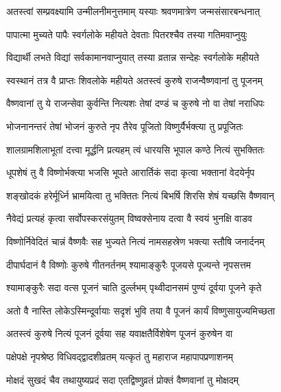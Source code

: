 \label{sec:padma-unmilani}



\twolineshloka
{अतस्त्वां सम्प्रवक्ष्यामि उन्मीलनीमनुत्तमाम्}
{यस्याः श्रवणमात्रेण जन्मसंसारबन्धनात्}%

\twolineshloka
{पापात्मा मुच्यते पापैः स्वर्गलोके महीयते}
{देवताः पितरश्चैव तस्या गतिमवाप्नुयुः}%

\twolineshloka
{विद्यार्थी लभते विद्यां सर्वकामानवाप्नुयात्}
{तस्या व्रतान्न सन्देहः स्वर्गलोके महीयते}%

\twolineshloka
{स्वस्थानं तत्र वै प्राप्तः शिवलोके महीयते}
{अतस्त्वं कुरुषे राजन्वैष्णवानां तु पूजनम्}%

\twolineshloka
{वैष्णवानां तु ये राजन्सेवा कुर्वन्ति नित्यशः}
{तेषां दण्डं च कुरुषे नो वा तेषां नराधिपः}%

\twolineshloka
{भोजनानन्तरं तेषां भोजनं कुरुते नृप}
{तैरेव पूजितो विष्णुर्यैर्भक्त्या तु प्रपूजितः}%

\twolineshloka
{शालग्रामशिलाभूतां दत्त्वा मूर्द्धनि प्रत्यहम्}
{त्वं धारयसि भूपाल कण्ठे नित्यं सुभक्तितः}%

\twolineshloka
{धूपशेषं तु वै विष्णोर्भक्त्या भजसि भूपते}
{आरार्तिकं सदा कृत्वा भक्तानां वेदयेर्नृप}%

\twolineshloka
{शङ्खोदकं हरेर्मूर्ध्नि भ्रामयित्वा तु भक्तितः}
{नित्यं बिभर्षि शिरसि शेषं यच्छसि वैष्णवान्}%

\twolineshloka
{नैवेद्यं प्रत्यहं कृत्वा सर्वोपस्करसंयुतम्}
{विष्वक्सेनाय दत्वा वै स्वयं भुनक्षि वाडव}%

\twolineshloka
{विष्णोर्निवेदितं चान्नं वैष्णवैः सह भुज्यते}
{नित्यं नामसहस्रेण भक्त्या स्तौषि जनार्दनम्}%

\twolineshloka
{दीपार्घदानं वै विष्णोः कुरुषे गीतनर्तनम्}
{श्यामाङ्कुरैः पूजयसे पूज्यन्ते नृपसत्तम}%

\twolineshloka
{श्यामाङ्कुरैः सदा वत्स पूजनं चाति दुर्ल्लभम्}
{पृथ्वीदानसमं पुण्यं दूर्वया पूजने कृते}%

\twolineshloka
{अतो वै नास्ति लोकेऽस्मिन्दूर्वायाः सदृशं भुवि}
{तया वै पूजनं कार्यं विष्णुसायुज्यमिच्छता}%

\twolineshloka
{अतस्त्वं कुरुषे नित्यं पूजनं दूर्वया सह}
{यवाक्षतैर्विशेषेण पूजनं कुरुषेन वा}%

\twolineshloka
{पक्षेपक्षे नृपश्रेष्ठ विधिवद्द्वादशीव्रतम्}
{यत्कृतं तु महाराज महापापप्रणाशनम्}%

\twolineshloka
{मोक्षदं सुखदं चैव तथायुष्यप्रदं सदा}
{एतद्विष्णुव्रतं प्रोक्तं वैष्णवानां तु मोक्षदम्}%

